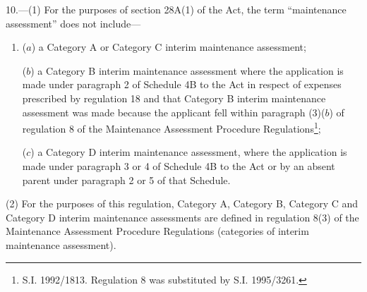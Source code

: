 \documentclass[12pt,a4paper]{article}
\begin{document}
10.—(1) For the purposes
of section 28A(1) of the Act, the term “maintenance assessment” does not
include—
\begin{enumerate}\item[]
($a$) a Category A or Category C interim maintenance assessment;

($b$) a Category B interim maintenance assessment where the application is made
under paragraph 2 of Schedule 4B to the Act in respect of expenses prescribed by
regulation 18 and that Category B interim maintenance assessment was made
because the applicant fell within paragraph (3)($b$) of regulation 8 of the
Maintenance Assessment Procedure Regulations\footnote{\frenchspacing S.I. 1992/1813. Regulation 8 was substituted by S.I. 1995/3261.};

($c$) a Category D interim maintenance assessment, where the application is made
under paragraph 3 or 4 of Schedule 4B to the Act or by an absent parent under
paragraph 2 or 5 of that Schedule.
\end{enumerate}

(2) For the purposes of this regulation, Category A, Category B, Category C and
Category D interim maintenance assessments are defined in regulation 8(3) of the
Maintenance Assessment Procedure Regulations (categories of interim maintenance
assessment).


%
%
\end{document}
